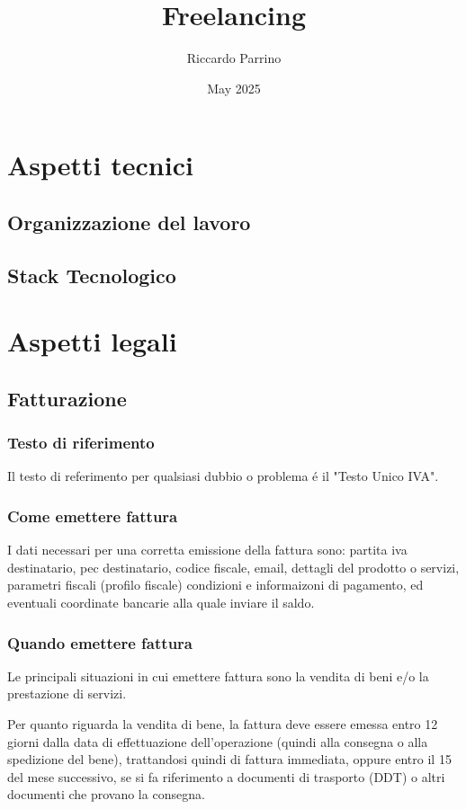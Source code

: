 \documentclass{article}
\title{Freelancing}
\author{Riccardo Parrino}
\date{May 2025}
\begin{document}
\maketitle

\section{Aspetti tecnici}
\subsection{Organizzazione del lavoro}
\subsection{Stack Tecnologico}

\section{Aspetti legali}

\subsection{Fatturazione}

\subsubsection{Testo di riferimento}
Il testo di referimento per qualsiasi dubbio o problema \'e il "Testo Unico IVA".

\subsubsection{Come emettere fattura}
I dati necessari per una corretta emissione della fattura sono: partita iva destinatario, pec destinatario, codice fiscale, email, 
dettagli del prodotto o servizi, parametri fiscali (profilo fiscale) condizioni e informaizoni di pagamento, ed eventuali coordinate bancarie alla quale inviare il saldo.


\subsubsection{Quando emettere fattura}
Le principali situazioni in cui emettere fattura sono la vendita di beni e/o la prestazione di servizi. 

Per quanto riguarda la vendita di bene, la fattura deve essere emessa entro 12 giorni dalla data di effettuazione dell'operazione (quindi alla consegna o alla spedizione del bene), trattandosi quindi di fattura immediata,
oppure entro il 15 del mese successivo, se si fa riferimento a documenti di trasporto (DDT) o altri documenti che provano la consegna.
\end{document}
